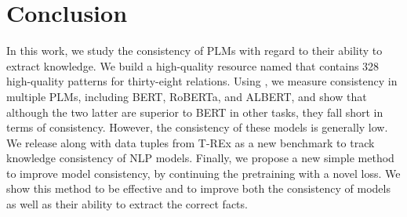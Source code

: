 \section{Conclusion}
\label{sec:conclusions}

In this work, we study the consistency of PLMs with regard to their ability to extract knowledge.
We build a high-quality resource named \resource{} that contains 328 high-quality patterns for thirty-eight relations.
Using \resource{}, we measure consistency in multiple PLMs,
including BERT, RoBERTa, and ALBERT, and show that although
the two latter are superior to BERT in other tasks, they
fall short in terms of consistency. However, the consistency
of these models is generally low.
We release \resource{} along with data tuples from T-REx as
a new benchmark to track knowledge consistency of NLP models.
Finally, we propose a new simple method to improve model consistency, by continuing the pretraining with a novel loss. We show this method to be effective and to improve both the consistency of models as well as their ability to extract the correct facts.

